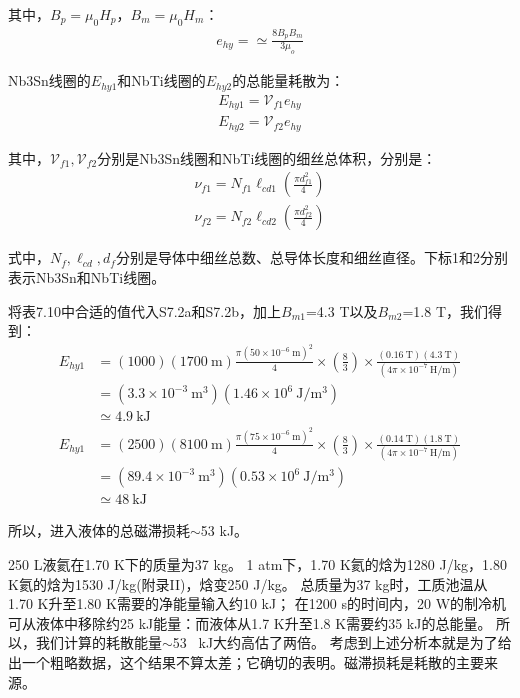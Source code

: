 其中，$B_p=\mu_0 H_p$，$B_m=\mu_0 H_m$：
\begin{align*}
e_{hy}=\simeq\frac{8B_pB_m}{3\mu_o} \tag{S7.1}
\end{align*}

Nb3Sn线圈的$E_{hy1}$和NbTi线圈的$E_{hy2}$的总能量耗散为：
\begin{align*}%
E_{hy1}=\mathcal{V}_{f1}e_{hy} \tag{S7.1a}
\end{align*}
\begin{align*}%
E_{hy2}=\mathcal{V}_{f2}e_{hy} \tag{S71.b}
\end{align*}

其中，$\mathcal{V}_{f1},\mathcal{V}_{f2}$分别是Nb3Sn线圈和NbTi线圈的细丝总体积，分别是：
\begin{align*}%
\nu_{f1}=N_{f1}\ell_{cd1}\left(\frac{\pi d_{f1}^{2}}{4}\right) \tag{S7.2a}
\end{align*}
\begin{align*}%
\nu_{f2}=N_{f2}\ell_{cd2}\left(\frac{\pi d_{f2}^{2}}{4}\right) \tag{S7.2b}
\end{align*}

式中，$N_f,\ell_{cd},d_f$分别是导体中细丝总数、总导体长度和细丝直径。下标1和2分别表示Nb3Sn和NbTi线圈。

将表7.10中合适的值代入S7.2a和S7.2b，加上$B_{m1}$=4.3 T以及$B_{m2}$=1.8 T，我们得到：
\begin{align*}%
E_{hy1}&=(1000)(1700\ \mathrm{m})\frac{\pi(50\times 10^{-6}\ \mathrm{m})^2}{4} 
\times\left(\frac{8}{3}\right)\times\frac{(0.16\ \mathrm{T})(4.3\ \mathrm{T})}{(4\pi\times 10^{-7}\ \mathrm{H/m})} \\
&=(3.3\times 10^{-3}\ \mathrm{m^3})(1.46\times 10^6\ \mathrm{J/m^3})\\ \tag{S7.3a}
&\simeq 4.9\ \mathrm{kJ}
\end{align*}
\begin{align*}%
E_{hy1}&=(2500)(8100\ \mathrm{m})\frac{\pi(75\times 10^{-6}\ \mathrm{m})^2}{4} 
\times\left(\frac{8}{3}\right)\times\frac{(0.14\ \mathrm{T})(1.8\ \mathrm{T})}{(4\pi\times 10^{-7}\ \mathrm{H/m})} \\
&=(89.4\times 10^{-3}\ \mathrm{m^3})(0.53\times 10^6\ \mathrm{J/m^3})\\ \tag{S7.3b}
&\simeq 48\ \mathrm{kJ}
\end{align*}

所以，进入液体的总磁滞损耗$\sim$53 kJ。

250 L液氦在1.70 K下的质量为37 kg。
1 atm下，1.70 K氦的焓为1280 J/kg，1.80 K氦的焓为1530 J/kg(附录II)，焓变250 J/kg。
总质量为37 kg时，工质池温从1.70 K升至1.80 K需要的净能量输入约10 kJ；
在1200 s的时间内，20 W的制冷机可从液体中移除约25 kJ能量：而液体从1.7 K升至1.8 K需要约35 kJ的总能量。
所以，我们计算的耗散能量$\sim$53~ kJ大约高估了两倍。
考虑到上述分析本就是为了给出一个粗略数据，这个结果不算太差；它确切的表明。磁滞损耗是耗散的主要来源。

